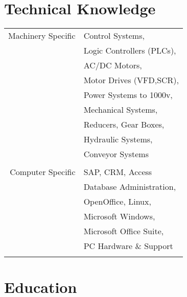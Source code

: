 \documentclass[11pt]{article} %
\begin{document}
\begin{minipage}[t]{0.44\textwidth}
\begin{tabular}{rl}
\end{tabular}\\[10pt]


\section{Technical Knowledge} 

\begin{tabular}{rl}
Machinery Specific
& Control Systems, \\ 
& Logic Controllers (PLCs), \\
& AC/DC Motors, \\
& Motor Drives (VFD,SCR), \\
& Power Systems to 1000v, \\
& Mechanical Systems, \\
& Reducers, Gear Boxes, \\
& Hydraulic Systems, \\
& Conveyor Systems \\ \\
Computer Specific
& SAP, CRM, Access \\
& Database Administration, \\
& OpenOffice, Linux,\\
& Microsoft Windows, \\
& Microsoft Office Suite, \\
& PC Hardware \& Support\\%
\\
\end{tabular}


\section{Education} 

\begin{tabular}{rl} %



\end{tabular}
\end{minipage}
\end{document}
